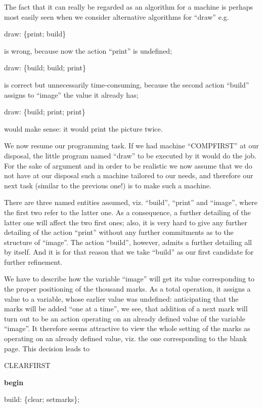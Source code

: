 The fact that it can really be regarded as an algorithm for a machine is perhaps most easily seen when we consider alternative algorithms for ``draw'' e.g.

draw: \{print; build\}

\noindent
is wrong, because now the action ``print'' is undefined;

draw: \{build; build; print\}

\noindent
is correct but unnecessarily time-consuming, because the second action ``build'' assigns to ``image'' the value it already has;

draw: \{build; print; print\}

\noindent
would make sense: it would print the picture twice.

We now resume our programming task. If we had machine ``COMPFIRST'' at our disposal, the little program named ``draw'' to be executed by it would do the job. For the sake of argument and in order to be realistic we now assume that we do not have at our disposal such a machine tailored to our needs, and therefore our next task (similar to the previous one!) is to make such a machine.

There are three named entities assumed, viz. ``build'', ``print'' and ``image'', where the first two refer to the latter one. As a consequence, a further detailing of the latter one will affect the two first ones; also, it is very hard to give any further detailing of the action ``print'' without any further commitments as to the structure of ``image''. The action ``build'', however, admits a further detailing all by itself. And it is for that reason that we take ``build'' as our first candidate for further refinement.

We have to describe how the variable ``image'' will get its value corresponding to the proper positioning of the thousand marks. As a total operation, it assigns a value to a variable, whose earlier value was undefined: anticipating that the marks will be added ``one at a time'', we see, that addition of a next mark will turn out to be an action operating on an already defined value of the variable ``image''. It therefore seems attractive to view the whole setting of the marks as operating on an already defined value, viz. the one corresponding to the blank page. This decision leads to

CLEARFIRST

\textbf{begin}

\quad build: \{clear; setmarks\};

